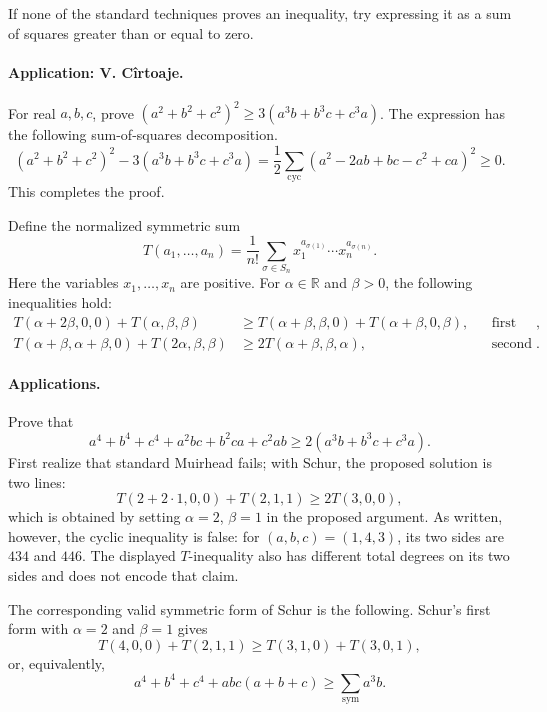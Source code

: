 \documentclass[11pt,a4paper]{article}
\begin{document}
\setcounter{theorem}{52}\begin{lemma}\label{lemma:lb1-58}
If none of the standard techniques proves an inequality, try expressing it as a sum of squares greater than or equal to zero.
\end{lemma}
\paragraph{Application: V. C\^{i}rtoaje.}
For real $a,b,c$, prove $(a^2+b^2+c^2)^2\geq3(a^3b+b^3c+c^3a)$.
The expression has the following sum-of-squares decomposition.
\[
(a^2+b^2+c^2)^2-3(a^3b+b^3c+c^3a)
=\frac12\sum_{\mathrm{cyc}}(a^2-2ab+bc-c^2+ca)^2\geq0.
\]
This completes the proof.

\setcounter{theorem}{59}\begin{lemma}
Define the normalized symmetric sum
\[
T(a_1,\ldots,a_n)=\frac1{n!}\sum_{\sigma\in S_n}
x_1^{a_{\sigma(1)}}\cdots x_n^{a_{\sigma(n)}}.
\]
Here the variables $x_1,\ldots,x_n$ are positive. For
$\alpha\in\mathbb R$ and $\beta>0$, the following inequalities hold:
\begin{align*}
T(\alpha+2\beta,0,0)+T(\alpha,\beta,\beta)
&\geq T(\alpha+\beta,\beta,0)+T(\alpha+\beta,0,\beta),&&\text{first form},\\
T(\alpha+\beta,\alpha+\beta,0)+T(2\alpha,\beta,\beta)
&\geq2T(\alpha+\beta,\beta,\alpha),&&\text{second form}.
\end{align*}
\end{lemma}
\paragraph{Applications.}
Prove that
\[
a^4+b^4+c^4+a^2bc+b^2ca+c^2ab\geq2(a^3b+b^3c+c^3a).
\]
First realize that standard Muirhead fails; with Schur, the proposed
solution is two lines:
\[
T(2+2\cdot1,0,0)+T(2,1,1)\geq2T(3,0,0),
\]
which is obtained by setting $\alpha=2$, $\beta=1$ in the proposed argument.
As written, however, the cyclic inequality is false: for $(a,b,c)=(1,4,3)$,
its two sides are $434$ and $446$. The displayed $T$-inequality also has
different total degrees on its two sides and does not encode that claim.

The corresponding valid symmetric form of Schur is the following.
Schur's first form with $\alpha=2$ and $\beta=1$ gives
\[
T(4,0,0)+T(2,1,1)\geq T(3,1,0)+T(3,0,1),
\]
or, equivalently,
\[
a^4+b^4+c^4+abc(a+b+c)\geq\sum_{\mathrm{sym}}a^3b.
\]
\end{document}
